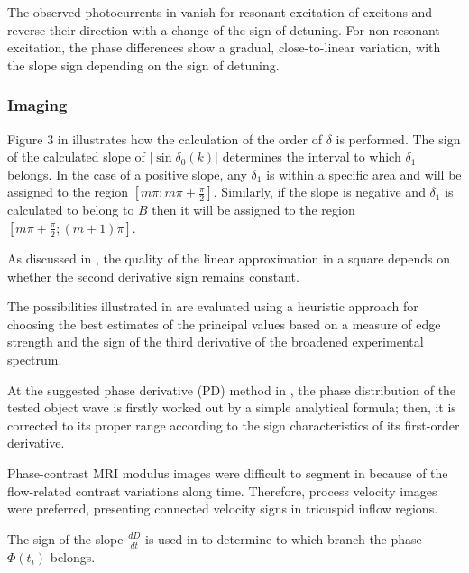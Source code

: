 \documentclass[11pt]{book}
\begin{document}
The observed photocurrents in \cite{priyadarshi2013all} vanish for
resonant excitation of excitons and reverse their direction with a
change of the sign of detuning. For non-resonant excitation, the phase
differences show a gradual, close-to-linear variation, with the slope
sign depending on the sign of detuning.


\subsubsection{Imaging}

Figure 3 in \cite{geday2000images} illustrates how the calculation
of the order of $\delta$ is performed. The sign of the calculated
slope of $\left|\sin\delta_{0}\left(k\right)\right|$ determines the
interval to which $\delta_{1}$ belongs. In the case of a positive
slope, any $\delta_{1}$ is within a specific area and will be assigned
to the region $\left[m\pi;m\pi+\frac{\pi}{2}\right]$. Similarly,
if the slope is negative and $\delta_{1}$ is calculated to belong
to $B$ then it will be assigned to the region $\left[m\pi+\frac{\pi}{2};\left(m+1\right)\pi\right]$.

As discussed in \cite{yang2005approach}, the quality of the linear
approximation in a square depends on whether the second derivative
sign remains constant.

The possibilities illustrated in \cite{denny2007computing} are evaluated
using a heuristic approach for choosing the best estimates of the
principal values based on a measure of edge strength and the sign
of the third derivative of the broadened experimental spectrum.

At the suggested phase derivative (PD) method in \cite{guo2014phase},
the phase distribution of the tested object wave is firstly worked
out by a simple analytical formula; then, it is corrected to its proper
range according to the sign characteristics of its first-order derivative.

Phase-contrast MRI modulus images were difficult to segment in \cite{kachenoura2015right}
because of the flow-related contrast variations along time. Therefore,
process velocity images were preferred, presenting connected velocity
signs in tricuspid inflow regions.

The sign of the slope $\frac{dD}{dt}$ is used in \cite{wang2016scattering}
to determine to which branch the phase $\Phi\left(t_{i}\right)$ belongs.
\end{document}

